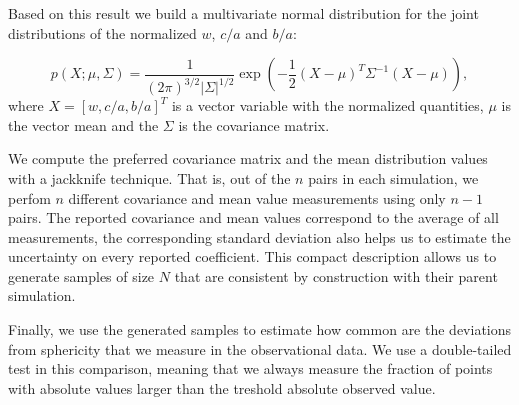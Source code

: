 \documentclass[a4paper,fleqn,usenatbib]{mnras}
\begin{document}
Based on this result we build a multivariate normal distribution for
the joint distributions of the normalized $w$, $c/a$ and $b/a$:

\begin{equation}
p(X; \mu, \Sigma) = \frac{1}{(2\pi)^{3/2}|\Sigma|^{1/2}}
\exp\left(-\frac{1}{2}(X-\mu)^{T}\Sigma^{-1}(X-\mu)\right), 
\label{eq:multivariate}
\end{equation}
% 
where $X=[w, c/a, b/a]^{T}$ is a vector variable with the normalized
quantities, $\mu$ is the vector mean and the $\Sigma$ is the
covariance matrix.  


We compute the preferred covariance matrix and the mean distribution values
with a jackknife technique. 
That is, out of the $n$ pairs in each simulation, we perfom $n$
different covariance and mean value measurements using only $n-1$ pairs. 
The reported covariance and mean values correspond to the average of
all measurements, the corresponding standard deviation also helps us to
estimate the uncertainty on every reported coefficient.
This compact description allows us to generate samples of size $N$
that are consistent by construction with their parent simulation. 

Finally, we use the generated samples to estimate how
common are the deviations from sphericity that we measure in the
observational data.  
We use a double-tailed test in this comparison, meaning that we
always measure the fraction of points with absolute values larger than the
treshold absolute observed value. 


\end{document}
